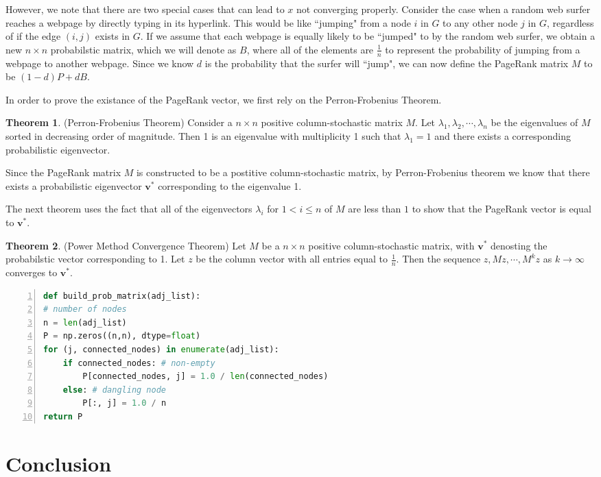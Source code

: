 \documentclass[11pt]{article}
\theoremstyle{definition}
\newtheorem{theorem}{Theorem}
\renewcommand{\vec}[1]{\mathbf{#1}}
\begin{document}
However, we note that there are two special cases that can lead to $x$ not converging properly.
Consider the case when a random web surfer reaches a webpage by directly typing in its hyperlink. This would be like ``jumping" from a node $i$ in $G$ to any other node $j$ in $G$, regardless of if the edge $(i,j)$ exists in $G$.
If we assume that each webpage is equally likely to be ``jumped" to by the random web surfer, we obtain a new $n\times n$ probabilstic matrix, which we will denote as $B$, where all of the elements are $\frac{1}{n}$ to represent the probability of jumping from a webpage to another webpage. Since we know $d$ is the probability that the surfer will ``jump",  we can now define the PageRank matrix $M$ to be $(1-d)P + dB$.

In order to prove the existance of the PageRank vector, we first rely on the Perron-Frobenius Theorem.
\begin{theorem}
    (Perron-Frobenius Theorem) Consider a $n\times n$ positive column-stochastic matrix $M$. Let $\lambda_1, \lambda_2, \cdots, \lambda_n$ be the eigenvalues of $M$ sorted in decreasing order of magnitude. Then 1 is an eigenvalue with multiplicity 1 such that $\lambda_1=1$ and there exists a corresponding probabilistic eigenvector.
\end{theorem}

Since the PageRank matrix $M$ is constructed to be a postitive column-stochastic matrix, by Perron-Frobenius theorem we know that there exists a probabilistic eigenvector $\vec{v}^*$ corresponding to the eigenvalue 1.

The next theorem uses the fact that all of the eigenvectors $\lambda_i$ for $1<i\leq n$ of $M$ are less than $1$ to show that the PageRank vector is equal to $\vec{v}^*$.
\begin{theorem}
    (Power Method Convergence Theorem) Let $M$ be a $n\times n$ positive column-stochastic matrix, with $\vec{v}^*$ denosting the probabilstic vector corresponding to 1. Let $z$ be the column vector with all entries equal to $\frac{1}{n}$. Then the sequence $z, Mz, \cdots, M^kz$ as $k\to \infty$ converges to $\vec{v}^*$.    
\end{theorem}

\begin{lstlisting}[language=python, basicstyle={\small\ttfamily}, numbers=left]
def build_prob_matrix(adj_list):
# number of nodes
n = len(adj_list)
P = np.zeros((n,n), dtype=float)
for (j, connected_nodes) in enumerate(adj_list):
    if connected_nodes: # non-empty
        P[connected_nodes, j] = 1.0 / len(connected_nodes)
    else: # dangling node
        P[:, j] = 1.0 / n
return P
\end{lstlisting}


\section{Conclusion}

\begin{thebibliography}{9}
\bibitem{}

\end{thebibliography}
\end{document}
